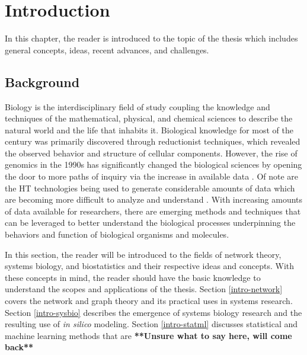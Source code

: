 
\chapter{Introduction}
\bigskip

In this chapter, the reader is introduced to the topic of the thesis which includes general concepts, ideas, recent advances, and challenges.

\section{Background}\label{intro-background}

Biology is the interdisciplinary field of study coupling the knowledge and techniques of the mathematical, physical, and chemical sciences to describe the natural world and the life that inhabits it. Biological knowledge for most of the  century was primarily discovered through reductionist techniques, which revealed the observed behavior and structure of cellular components. However, the rise of genomics in the 1990s has significantly changed the biological sciences by opening the door to more paths of inquiry via the increase in available data \citep{Palsson2000}. Of note are the \acrfull{HT} technologies being used to generate considerable amounts of data which are becoming more difficult to analyze and understand \citep{Sboner2011}. With increasing amounts of data available for researchers, there are emerging methods and techniques that can be leveraged to better understand the biological processes underpinning the behaviors and function of biological organisms and molecules.

In this section, the reader will be introduced to the fields of network theory,  systems biology,  and biostatistics and their respective ideas and concepts. With these concepts in mind, the reader should have the basic knowledge to understand the scopes and applications of the thesis. Section \ref{intro-network} covers the network and graph theory and its practical uses in systems research. Section \ref{intro-sysbio} describes the emergence of systems biology research and the resulting use of \textit{in silico} modeling.  Section \ref{intro-statml} discusses statistical and machine learning methods that are \textbf{**Unsure what to say here, will come back**}




